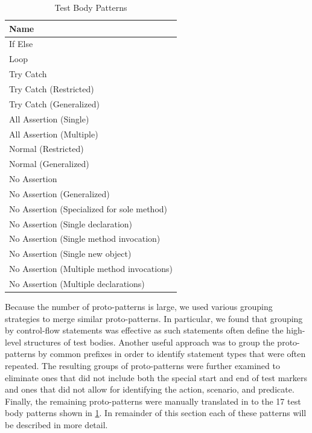 \documentclass[proposal.tex]{subfiles}
\begin{document}
\begin{table}[t]
\scriptsize
\centering
\begin{tabular}{l} 
\toprule
\textbf{Name} \\
\midrule
If Else  \\
Loop  \\
Try Catch  \\
Try Catch (Restricted) \\
Try Catch (Generalized) \\
All Assertion (Single) \\
All Assertion (Multiple) \\
Normal (Restricted) \\
Normal (Generalized) \\
No Assertion \\
No Assertion (Generalized) \\
No Assertion (Specialized for sole method) \\
No Assertion (Single declaration) \\
No Assertion (Single method invocation) \\
No Assertion (Single new object) \\
No Assertion (Multiple method invocations) \\
No Assertion (Multiple declarations) \\
\bottomrule
\end{tabular}
\caption{Test Body Patterns}
\label{tab:body-patterns}
\end{table}




Because the number of proto-patterns is large, we used various grouping strategies to merge similar proto-patterns.
%
In particular, we found that grouping by control-flow statements was effective as such statements often define the high-level structures of test bodies.
%
Another useful approach was to group the proto-patterns by common prefixes in order to identify statement types that were often repeated.
%
The resulting groups of proto-patterns were further examined to eliminate ones that did not include both the special start and end of test markers and ones that did not allow for identifying the action, scenario, and predicate.
%
Finally, the remaining proto-patterns were manually translated in to the \num{17} test body patterns shown in \cref{tab:body-patterns}.
%
In remainder of this section each of these patterns will be described in more detail.
\end{document}
